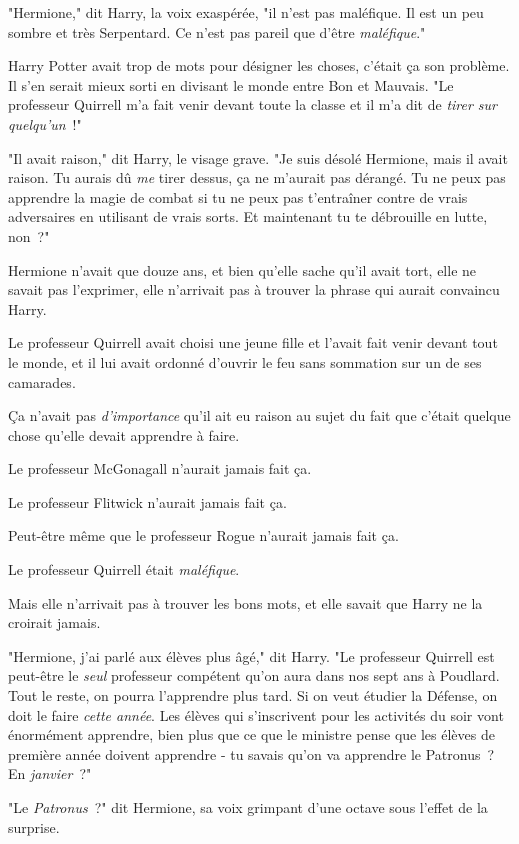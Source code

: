 "Hermione," dit Harry, la voix exaspérée, "il n'est pas maléfique. Il est un peu sombre et très Serpentard. Ce n'est pas pareil que d'être \emph{maléfique}."

Harry Potter avait trop de mots pour désigner les choses, c'était ça son problème. Il s'en serait mieux sorti en divisant le monde entre Bon et Mauvais. "Le professeur Quirrell m'a fait venir devant toute la classe et il m'a dit de \emph{tirer sur quelqu'un}~!"

"Il avait raison," dit Harry, le visage grave. "Je suis désolé Hermione, mais il avait raison. Tu aurais dû \emph{me} tirer dessus, ça ne m'aurait pas dérangé. Tu ne peux pas apprendre la magie de combat si tu ne peux pas t'entraîner contre de vrais adversaires en utilisant de vrais sorts. Et maintenant tu te débrouille en lutte, non~?"

Hermione n'avait que douze ans, et bien qu'elle sache qu'il avait tort, elle ne savait pas l'exprimer, elle n'arrivait pas à trouver la phrase qui aurait convaincu Harry.

Le professeur Quirrell avait choisi une jeune fille et l'avait fait venir devant tout le monde, et il lui avait ordonné d'ouvrir le feu sans sommation sur un de ses camarades.

Ça n'avait pas \emph{d'importance} qu'il ait eu raison au sujet du fait que c'était quelque chose qu'elle devait apprendre à faire.

Le professeur McGonagall n'aurait jamais fait ça.

Le professeur Flitwick n'aurait jamais fait ça.

Peut-être même que le professeur Rogue n'aurait jamais fait ça.

Le professeur Quirrell était \emph{maléfique}.

Mais elle n'arrivait pas à trouver les bons mots, et elle savait que Harry ne la croirait jamais.

"Hermione, j'ai parlé aux élèves plus âgé," dit Harry. "Le professeur Quirrell est peut-être le \emph{seul} professeur compétent qu'on aura dans nos sept ans à Poudlard. Tout le reste, on pourra l'apprendre plus tard. Si on veut étudier la Défense, on doit le faire \emph{cette année}. Les élèves qui s'inscrivent pour les activités du soir vont énormément apprendre, bien plus que ce que le ministre pense que les élèves de première année doivent apprendre - tu savais qu'on va apprendre le Patronus~? En \emph{janvier}~?"

"Le \emph{Patronus}~?" dit Hermione, sa voix grimpant d'une octave sous l'effet de la surprise.

